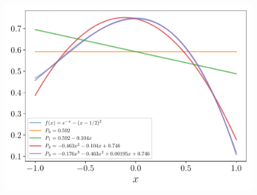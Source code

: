 \documentclass[9pt, aspectratio=169]{beamer}
\begin{document}
\begin{frame}
    \begin{center}
        \includegraphics[width=0.8\textwidth]{figs/fig-05.pdf}
    \end{center}
\end{frame}
\end{document}
